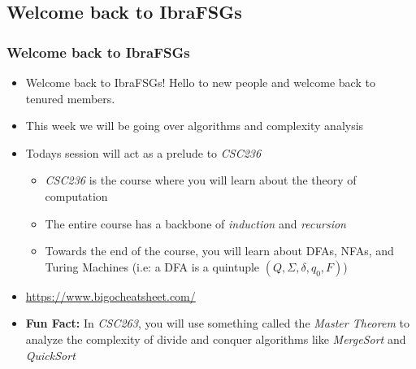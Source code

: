 \documentclass[hyperref={colorlinks,citecolor=blue,linkcolor=blue,urlcolor=blue}, aspectratio=1610]{beamer}
\begin{document}
\subsection{Welcome back to IbraFSGs\texttrademark{}}
\begin{frame}
    \frametitle{Welcome back to IbraFSGs\texttrademark{}}
    \begin{itemize}
        \item Welcome back to IbraFSGs\texttrademark{}! Hello to new people and welcome back to tenured members.
        \item This week we will be going over algorithms and complexity analysis
        \item Todays session will act as a prelude to \textit{CSC236}
        \begin{itemize}
          \item \textit{CSC236} is the course where you will learn about the theory of computation
          \item The entire course has a backbone of \textit{induction} and \textit{recursion}
          \item Towards the end of the course, you will learn about DFAs, NFAs, and Turing Machines (i.e: a DFA is a quintuple $(Q, \Sigma, \delta, q_0, F)$)
        \end{itemize}
        \pause
        \item \url{https://www.bigocheatsheet.com/}
        \pause
        \item \textbf{Fun Fact:} In \textit{CSC263}, you will use something called the \textit{Master Theorem} to analyze the complexity of divide and conquer algorithms like \textit{MergeSort} and \textit{QuickSort}
    \end{itemize}  

\end{frame}
\end{document}
